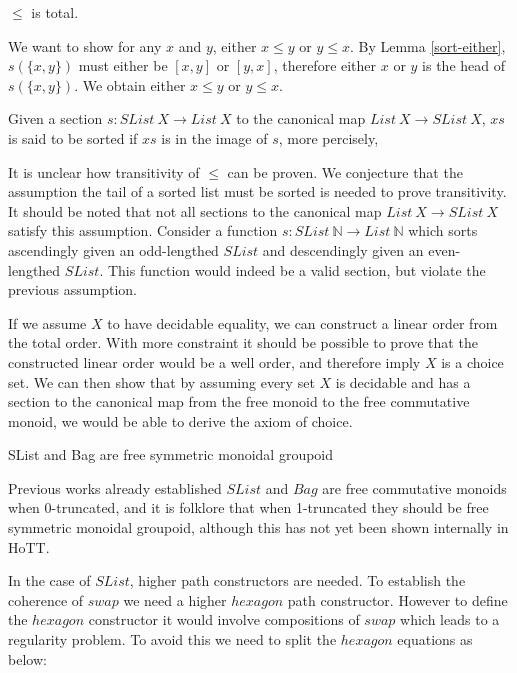 \documentclass{article}
\begin{document}
\begin{mythm}
    $\leq$ is total.
\end{mythm}
    We want to show for any $x$ and $y$, either $x \leq y$ or $y \leq x$.
    By Lemma \ref{sort-either}, $s(\{x, y\})$ must either be $[x, y]$ or $[y, x]$, therefore either $x$ or $y$
    is the head of $s(\{x, y\})$. We obtain either $x \leq y$ or $y \leq x$.

\begin{mydef}
    Given a section $s : SList \: X \rightarrow List \: X$ to the canonical map $List \: X \rightarrow SList \: X$,
    $xs$ is said to be sorted if $xs$ is in the image of $s$, more percisely, 
\end{mydef}

It is unclear how transitivity of $\leq$ can be proven. We conjecture that the assumption the tail of a sorted list
must be sorted is needed to prove transitivity. It should be noted that not all sections to the canonical map $List \: X \rightarrow SList \: X$
satisfy this assumption. Consider a function $s : SList \: \mathbb{N} \rightarrow List \: \mathbb{N}$ which sorts ascendingly given an odd-lengthed
$SList$ and descendingly given an even-lengthed $SList$. This function would indeed be a valid section, but violate the previous assumption.

If we assume $X$ to have decidable equality, we can construct a linear order from the total order.
With more constraint it should be possible to prove that the constructed linear order would be a well order, and therefore imply $X$ is a choice
set. We can then show that by assuming every set $X$ is decidable and has a section to the canonical map from the free monoid to the free commutative monoid, we
would be able to derive the axiom of choice.

\begin{myconj}
    SList and Bag are free symmetric monoidal groupoid
\end{myconj}
Previous works already established $SList$ and $Bag$ are free commutative
monoids when 0-truncated, and it is folklore that when 1-truncated they should be free symmetric monoidal groupoid, although
this has not yet been shown internally in HoTT. 

In the case of $SList$, higher path constructors are needed. To establish the coherence of $swap$ we need a higher $hexagon$
path constructor. However to define the $hexagon$ constructor it would involve compositions of $swap$ which leads to a regularity
problem. To avoid this we need to split the $hexagon$ equations as below:
\end{document}
